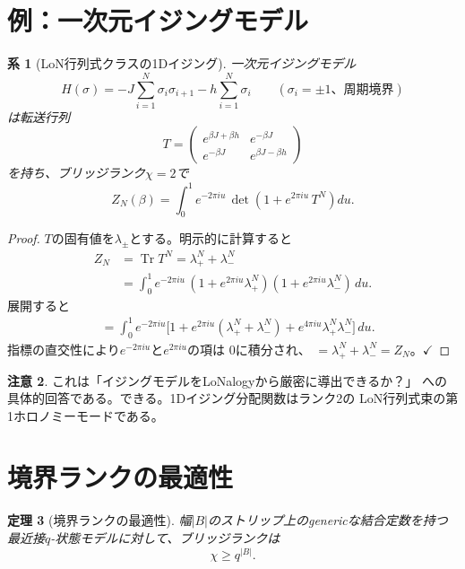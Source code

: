 \documentclass[12pt]{article}
\theoremstyle{plain}
\newtheorem{theorem}{定理}[section]
\newtheorem{corollary}[theorem]{系}
\theoremstyle{definition}
\newtheorem{remark}[theorem]{注意}
\numberwithin{equation}{section}
\DeclareMathOperator{\Tr}{Tr}
\begin{document}
\section{例：一次元イジングモデル}\label{sec:ising}

\begin{corollary}[LoN行列式クラスの1Dイジング]\label{cor:ising}
一次元イジングモデル
\[
H(\sigma) = -J\sum_{i=1}^N\sigma_i\sigma_{i+1}
-h\sum_{i=1}^N\sigma_i
\qquad(\sigma_i=\pm1\text{、周期境界})
\]
は転送行列
\begin{equation}
T = \begin{pmatrix}
e^{\beta J+\beta h} & e^{-\beta J}\\
e^{-\beta J} & e^{\beta J-\beta h}
\end{pmatrix}
\end{equation}
を持ち、ブリッジランク$\chi=2$で
\begin{equation}\label{eq:isingLoN}
\boxed{Z_N(\beta)
= \int_0^1 e^{-2\pi iu}\,
\det\!\left(1+e^{2\pi iu}\,T^N\right)du.}
\end{equation}
\end{corollary}

\begin{proof}
$T$の固有値を$\lambda_\pm$とする。明示的に計算すると
\begin{align}
Z_N &= \Tr T^N = \lambda_+^N+\lambda_-^N\\
&= \int_0^1 e^{-2\pi iu}\,
(1+e^{2\pi iu}\lambda_+^N)(1+e^{2\pi iu}\lambda_-^N)\,du.
\end{align}
展開すると
\begin{align}
&= \int_0^1 e^{-2\pi iu}\bigl[1
+e^{2\pi iu}(\lambda_+^N+\lambda_-^N)
+e^{4\pi iu}\lambda_+^N\lambda_-^N\bigr]\,du.
\end{align}
指標の直交性により$e^{-2\pi iu}$と$e^{2\pi iu}$の項は
0に積分され、
$= \lambda_+^N+\lambda_-^N = Z_N$。$\checkmark$
\end{proof}

\begin{remark}
これは「イジングモデルをLoNalogyから厳密に導出できるか？」
への具体的回答である。できる。1Dイジング分配関数はランク2の
LoN行列式束の第1ホロノミーモードである。
\end{remark}


\section{境界ランクの最適性}\label{sec:optimality}

\begin{theorem}[境界ランクの最適性]\label{thm:optimality}
幅$|B|$のストリップ上のgenericな結合定数を持つ
最近接$q$-状態モデルに対して、ブリッジランクは
\begin{equation}
\boxed{\chi \geq q^{|B|}.}
\end{equation}
\end{theorem}
\end{document}
